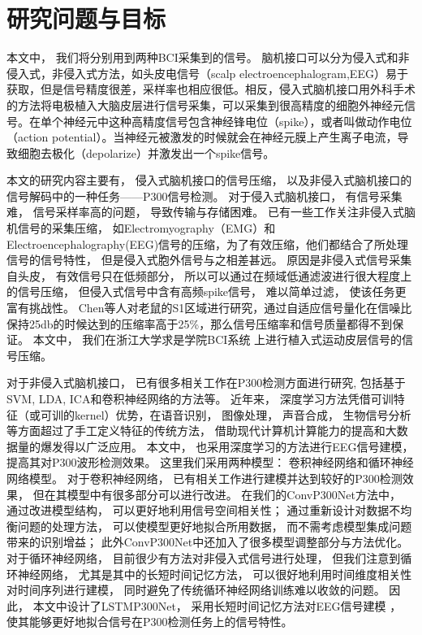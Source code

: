 \section{研究问题与目标}

本文中， 我们将分别用到两种BCI采集到的信号。 脑机接口可以分为侵入式和非侵入式，非侵入式方法，如头皮电信号（scalp electroencephalogram,EEG）易于获取，但是信号精度很差，采样率也相应很低。相反，侵入式脑机接口用外科手术的方法将电极植入大脑皮层进行信号采集，可以采集到很高精度的细胞外神经元信号。在单个神经元中这种高精度信号包含神经锋电位（spike），或者叫做动作电位（action potential）。当神经元被激发的时候就会在神经元膜上产生离子电流，导致细胞去极化（depolarize）并激发出一个spike信号。

本文的研究内容主要有， 侵入式脑机接口的信号压缩， 以及非侵入式脑机接口的信号解码中的一种任务——P300信号检测。 对于侵入式脑机接口， 有信号采集难， 信号采样率高的问题， 导致传输与存储困难。 已有一些工作关注非侵入式脑机信号的采集压缩， 如Electromyography（EMG）和Electroencephalography(EEG)信号的压缩\cite{24,25}，为了有效压缩，他们都结合了所处理信号的信号特性， 但是侵入式胞外信号与之相差甚远。 原因是非侵入式信号采集自头皮， 有效信号只在低频部分， 所以可以通过在频域低通滤波进行很大程度上的信号压缩， 但侵入式信号中含有高频spike信号， 难以简单过滤， 使该任务更富有挑战性。 Chen等人对老鼠的S1区域进行研究，通过自适应信号量化在信噪比保持25db的时候达到的压缩率高于25\%，那么信号压缩率和信号质量都得不到保证。 本文中， 我们在浙江大学求是学院BCI系统 \cite{14}上进行植入式运动皮层信号的信号压缩。

对于非侵入式脑机接口， 已有很多相关工作在P300检测方面进行研究, 包括基于SVM\cite{rakotomamonjy2008bci}, LDA\cite{breiman1996bagging}, ICA\cite{yang2008p300}和卷积神经网络\cite{felzer2003analyzing,anderson1995determining,cecotti2008time,masic1995neural,masic1993neural}的方法等。 近年来， 深度学习方法凭借可训特征（或可训的kernel）优势，在语音识别， 图像处理， 声音合成， 生物信号分析等方面超过了手工定义特征的传统方法， 借助现代计算机计算能力的提高和大数据量的爆发得以广泛应用。 本文中， 也采用深度学习的方法进行EEG信号建模， 提高其对P300波形检测效果。 这里我们采用两种模型： 卷积神经网络和循环神经网络模型。 对于卷积神经网络， 已有相关工作进行建模并达到较好的P300检测效果， 但在其模型中有很多部分可以进行改进。 在我们的ConvP300Net方法中， 通过改进模型结构， 可以更好地利用信号空间相关性； 通过重新设计对数据不均衡问题的处理方法， 可以使模型更好地拟合所用数据， 而不需考虑模型集成问题带来的识别增益； 此外ConvP300Net中还加入了很多模型调整部分与方法优化。 对于循环神经网络， 目前很少有方法对非侵入式信号进行处理， 但我们注意到循环神经网络， 尤其是其中的长短时间记忆方法， 可以很好地利用时间维度相关性对时间序列进行建模， 同时避免了传统循环神经网络训练难以收敛的问题。 因此， 本文中设计了LSTMP300Net， 采用长短时间记忆方法对EEG信号建模 ， 使其能够更好地拟合信号在P300检测任务上的信号特性。 


